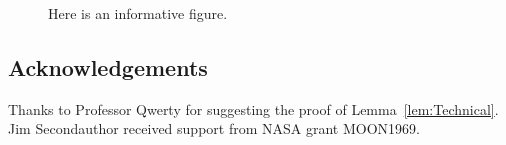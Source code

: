 \documentclass[12pt]{article}
\begin{document}
\begin{figure}[ht]
  \centering
  \caption{Here is an informative figure.\label{fig:InformativeFigure}}
\end{figure}

\subsection*{Acknowledgements}

Thanks to Professor Qwerty for suggesting the proof of
Lemma~\ref{lem:Technical}.
Jim Secondauthor received support from NASA grant MOON1969.

\end{document}

